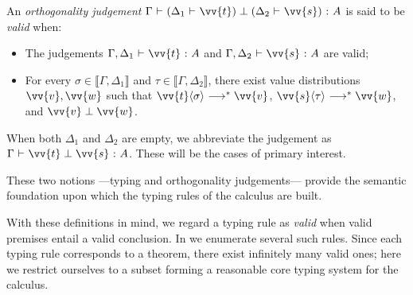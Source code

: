 \documentclass[runningheads,orivec,envcountsame,envcountsect]{llncs}
\newcommand\lra{\longrightarrow}
\newcommand\ansubst[2]{\ensuremath{\langle #1 \rangle_{#2}}}
\def\scal#1#2{\langle{#1}~|~{#2}\rangle}
\def\eval{\lra^*}
\def\sem#1{\llbracket#1\rrbracket}
\def\TYP#1#2#3{#1~{\vdash}~#2~{:}~#3}
\def\SORTH#1#2#3#4{#1~{\vdash}~#2\perp#3~{:}~#4}
\def\ORTH#1#2#3#4#5#6{#1~{\vdash}~(#2~{\vdash}~#3)\perp(#4~{\vdash}~#5)~{:}~#6}
\newcommand\B{\mathbb B}
\newcommand\XB{\mathbb X}
\newcommand\basis[1]{\ensuremath{\flat_{#1}}}
\begin{document}
\begin{definition}
  An \emph{orthogonality judgement}
  $\ORTH{\Gamma}{\Delta_1}{\vv{t}}{\Delta_2}{\vv{s}}{A}$
  is said to be \emph{valid} when:
  \begin{itemize}
    \item The judgements
      $\TYP{\Gamma,\Delta_1}{\vv{t}}{A}$ and
      $\TYP{\Gamma,\Delta_2}{\vv{s}}{A}$ are valid;
    \item For every
      $\sigma\in\sem{\Gamma,\Delta_1}$ and
      $\tau\in\sem{\Gamma,\Delta_2}$,
      there exist value distributions $\vv{v},\vv{w}$ such that
      $\vv{t}\ansubst{\sigma}{}\eval\vv{v}$,
      $\vv{s}\ansubst{\tau}{}\eval\vv{w}$,
      and $\vv{v}\perp\vv{w}$.
  \end{itemize}
\end{definition}

When both $\Delta_1$ and $\Delta_2$ are empty,
we abbreviate the judgement as
$\SORTH{\Gamma}{\vv{t}}{\vv{s}}{A}$.
These will be the cases of primary interest.

These two notions ---typing and orthogonality judgements--- provide the
semantic foundation upon which the typing rules of the calculus are built.


With these definitions in mind, we regard a typing rule as \emph{valid} when
valid premises entail a valid conclusion.  
In  we enumerate several such rules.  
Since each typing rule corresponds to a theorem, there exist infinitely many
valid ones; here we restrict ourselves to a subset forming a reasonable core
typing system for the calculus.
\end{document}
